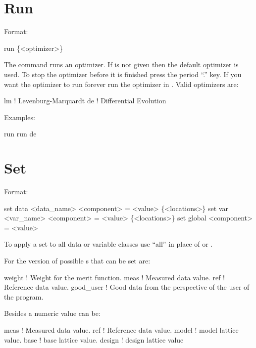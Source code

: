 \section{Run}
\label{s:run}

Format:
\begin{example}
  run \{<optimizer>\}
\end{example}

\vskip 0.2in The  command runs an optimizer. If
 is not given then the default optimizer is used. To
stop the optimizer before it is finished press the period ``.''
key. If you want the optimizer to run forever run the optimizer in
. Valid optimizers are:
\begin{example}
  lm            ! Levenburg-Marquardt
  de            ! Differential Evolution
\end{example}

Examples:
\begin{example}
  run 
  run de
\end{example}

\section{Set}
\label{s:set}

Format:
\begin{example}
  set data <data_name> <component> = <value> \{<locations>\}
  set var <var_name> <component> = <value> \{<locations>\}
  set global <component> = <value>
\end{example}

\vskip 0.2in
To apply a set to all data or variable classes use ``all''
in place of  or .

For the  version of  possible 
s that can be set are:
\begin{example}
  weight      ! Weight for the merit function.
  meas        ! Measured data value.
  ref         ! Reference data value.
  good_user   ! Good data from the perspective of the user of the \tao program.
\end{example}
Besides a numeric value  can be:
\begin{example}
  meas        ! Measured data value.
  ref         ! Reference data value.
  model       ! model lattice value.
  base        ! base lattice value.
  design      ! design lattice value
\end{example}

